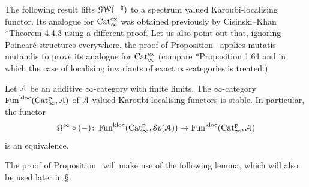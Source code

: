 The following result lifts $\operatorname{\mathcal{GW}}(-^\natural)$ to a spectrum valued Karoubi-localising functor.    
Its analogue for $\mathrm{Cat}_\infty^{\mathrm{ex}}$ was obtained previously %
by Cisinski--Khan \cite{CK}*{Theorem 4.4.3} using a different proof. 
Let us also point out that, ignoring Poincaré structures everywhere, 
the proof of Proposition~ applies mutatis mutandis to prove its analogue for $\mathrm{Cat}_\infty^{\mathrm{ex}}$ (compare \cite{Efimov}*{Proposition 1.64} and \cite{stable-envelope} in which the case of localising invariants of exact $\infty$-categories is treated.)

\begin{proposition}
\label{proposition:localising-are-stable}%
Let $\mathcal{A}$ be an additive $\infty$-category with finite limits. The $\infty$-category $\operatorname{Fun}^{\mathrm{kloc}}(\mathrm{Cat}^{\mathrm p}_\infty,\mathcal{A})$ of $\mathcal{A}$-valued Karoubi-localising functors is stable. In particular, the functor
\[
\Omega^\infty \circ (-)\colon \operatorname{Fun}^{\mathrm{kloc}}(\mathrm{Cat}^{\mathrm p}_\infty,{\mathcal Sp}(\mathcal{A}))\to \operatorname{Fun}^{\mathrm{kloc}}(\mathrm{Cat}^{\mathrm p}_\infty,\mathcal{A})
\]
is an equivalence. 
\end{proposition}


The proof of Proposition~ will make use of the following lemma, which will also be used later in \S{}.

